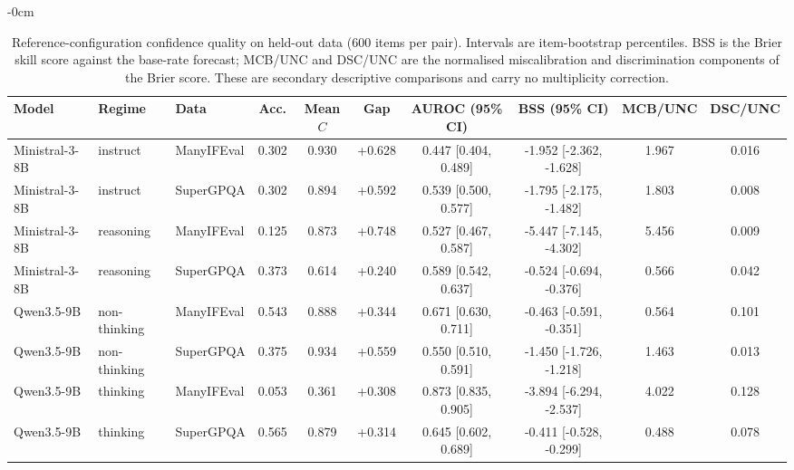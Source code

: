 \begin{table}[H]
\begin{adjustwidth}{-\extralength}{0cm}
\footnotesize
\caption{Reference-configuration confidence quality on held-out data (600 items per pair). Intervals are item-bootstrap percentiles. BSS is the Brier skill score against the base-rate forecast; MCB/UNC and DSC/UNC are the normalised miscalibration and discrimination components of the Brier score. These are secondary descriptive comparisons and carry no multiplicity correction.\label{tab:refquality}}
\begin{tabular}{lllccccccc}
\toprule
\textbf{Model} & \textbf{Regime} & \textbf{Data} & \textbf{Acc.} & \textbf{Mean $C$} & \textbf{Gap} & \textbf{AUROC (95\% CI)} & \textbf{BSS (95\% CI)} & \textbf{MCB/UNC} & \textbf{DSC/UNC} \\
\midrule
Ministral-3-8B & instruct & ManyIFEval & 0.302 & 0.930 & +0.628 & 0.447 [0.404, 0.489] & -1.952 [-2.362, -1.628] & 1.967 & 0.016 \tabularnewline
Ministral-3-8B & instruct & SuperGPQA & 0.302 & 0.894 & +0.592 & 0.539 [0.500, 0.577] & -1.795 [-2.175, -1.482] & 1.803 & 0.008 \tabularnewline
Ministral-3-8B & reasoning & ManyIFEval & 0.125 & 0.873 & +0.748 & 0.527 [0.467, 0.587] & -5.447 [-7.145, -4.302] & 5.456 & 0.009 \tabularnewline
Ministral-3-8B & reasoning & SuperGPQA & 0.373 & 0.614 & +0.240 & 0.589 [0.542, 0.637] & -0.524 [-0.694, -0.376] & 0.566 & 0.042 \tabularnewline
Qwen3.5-9B & non-thinking & ManyIFEval & 0.543 & 0.888 & +0.344 & 0.671 [0.630, 0.711] & -0.463 [-0.591, -0.351] & 0.564 & 0.101 \tabularnewline
Qwen3.5-9B & non-thinking & SuperGPQA & 0.375 & 0.934 & +0.559 & 0.550 [0.510, 0.591] & -1.450 [-1.726, -1.218] & 1.463 & 0.013 \tabularnewline
Qwen3.5-9B & thinking & ManyIFEval & 0.053 & 0.361 & +0.308 & 0.873 [0.835, 0.905] & -3.894 [-6.294, -2.537] & 4.022 & 0.128 \tabularnewline
Qwen3.5-9B & thinking & SuperGPQA & 0.565 & 0.879 & +0.314 & 0.645 [0.602, 0.689] & -0.411 [-0.528, -0.299] & 0.488 & 0.078 \tabularnewline
\bottomrule
\end{tabular}
\end{adjustwidth}
\end{table}
